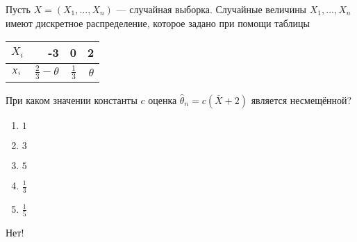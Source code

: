 \documentclass[t]{beamer}
\let\P\relax
\DeclareMathOperator{\P}{\mathbb{P}}
\begin{document}
 \begin{frame} \label{47-No} 
\begin{block}{47} 

Пусть $X = (X_1, \ldots , X_n)$ — случайная выборка. Случайные величины $X_1, ... , X_n$ имеют дискретное распределение, которое задано при помощи таблицы

\begin{center}
\begin{tabular}{lrrr} \toprule
$X_i$  & -3 & 0 & 2 \\
\midrule
$\P_{X_i}$ & $\frac{2}{3} - \theta$ & $\frac{1}{3}$ & $\theta$\\
\bottomrule
\end{tabular}
\end{center}

При каком значении константы $c$ оценка  $\hat{\theta}_n = c (\bar{X} + 2)$ является несмещённой?
  


 \end{block} 
\begin{enumerate} 
\item[] \hyperlink{47-No}{\beamergotobutton{} $1$}
\item[] \hyperlink{47-No}{\beamergotobutton{} $3$}
\item[] \hyperlink{47-No}{\beamergotobutton{} $5$}
\item[] \hyperlink{47-No}{\beamergotobutton{} $\frac{1}{3}$}
\item[] \hyperlink{47-Yes}{\beamergotobutton{} $\frac{1}{5}$}
\end{enumerate} 

 \alert{Нет!} 
\end{frame} 
\end{document}
